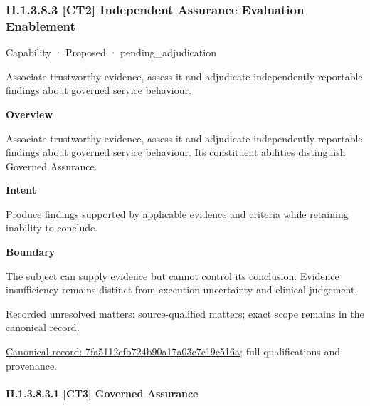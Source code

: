 \subsubsection*{II.1.3.8.3 [CT2] Independent Assurance Evaluation Enablement}
\label{navigation:II.1.3.8.3}

\label{element:7fa5112efb724b90a17a03c7c19c516a}
{\small Capability · Proposed · pending\_adjudication}\par

Associate trustworthy evidence, assess it and adjudicate independently reportable findings about governed service behaviour.



\textbf{Overview}



Associate trustworthy evidence, assess it and adjudicate independently reportable findings about governed service behaviour. Its constituent abilities distinguish Governed Assurance.



\textbf{Intent}



Produce findings supported by applicable evidence and criteria while retaining inability to conclude.



\textbf{Boundary}



The subject can supply evidence but cannot control its conclusion. Evidence insufficiency remains distinct from execution uncertainty and clinical judgement.


{\small Recorded unresolved matters: source-qualified matters; exact scope remains in the canonical record.}\par
{\footnotesize \href{../../../../../../../continuum/strategy/capability/7fa5112efb724b90a17a03c7c19c516a.md}{Canonical record: 7fa5112efb724b90a17a03c7c19c516a}; full qualifications and provenance.}\par
\paragraph*{II.1.3.8.3.1 [CT3] Governed Assurance}
\label{navigation:II.1.3.8.3.1}

